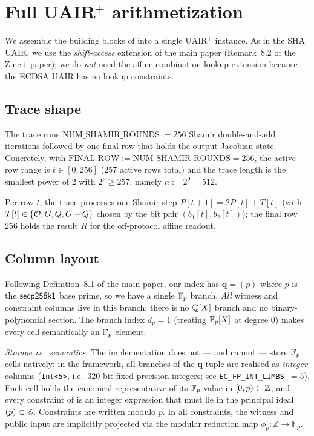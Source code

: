 \section{Full UAIR$^+$ arithmetization}\label{sec:uair}

We assemble the building blocks of  into a single
UAIR$^+$ instance. As in the SHA UAIR, we use the \emph{shift-access}
extension of the main paper (Remark~8.2 of the Zinc+ paper); we do
\emph{not} need the affine-combination lookup extension because the
ECDSA UAIR has no lookup constraints.

\subsection{Trace shape}\label{sec:trace-shape}

The trace runs $\mathrm{NUM\_SHAMIR\_ROUNDS} := 256$ Shamir
double-and-add iterations followed by one final row that holds the
output Jacobian state. Concretely, with
$\mathrm{FINAL\_ROW} := \mathrm{NUM\_SHAMIR\_ROUNDS} = 256$, the
active row range is $t \in [0, 256]$ ($257$ active rows total) and the
trace length is the smallest power of $2$ with
$2^{\nu} \ge 257$, namely $n := 2^{9} = 512$.

Per row $t$, the trace processes one Shamir step
$P[t+1] = 2P[t] + T[t]$ (with $T[t] \in \{\mathcal{O}, G, Q, G+Q\}$ chosen by
the bit pair $(b_1[t], b_2[t])$); the final row $256$ holds the
result $R$ for the off-protocol affine readout.

\subsection{Column layout}\label{sec:cols}

Following Definition~8.1 of the main paper, our index has
$\mathbf{q} = (p)$ where $p$ is the $\mathsf{secp256k1}$ base prime, so we have a
single $\mathbb{F}_p$ branch. \emph{All} witness and constraint columns live
in this branch; there is no $\mathbb{Q}[X]$ branch and no binary-polynomial
section. The branch index $d_p = 1$ (treating $\mathbb{F}_p[X]$ at degree $0$)
makes every cell semantically an $\mathbb{F}_p$ element.

\emph{Storage vs.\ semantics.} The implementation does not — and
cannot — store $\mathbb{F}_p$ cells natively: in the framework, all branches
of the $\mathbf{q}$-tuple are realised as \emph{integer} columns
(\texttt{Int<5>}, i.e.\ $320$-bit fixed-precision integers; see
\texttt{EC\_FP\_INT\_LIMBS}~$=5$). Each cell holds the canonical
representative of its $\mathbb{F}_p$ value in $[0, p) \subset \mathbb{Z}$, and every
constraint of  is an integer expression that
must lie in the principal ideal $(p) \subset \mathbb{Z}$. Constraints are written modulo $p$. In all constraints, the witness and public input are implicitly projected via the modular reduction map $\phi_p: \mathbb{Z}\to \mathbb{F}_p$.



